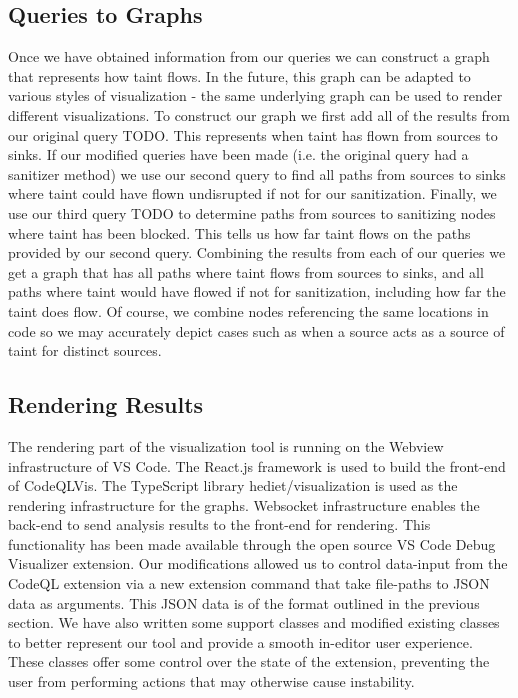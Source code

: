 \documentclass[sigplan,10pt,review]{acmart}
\begin{document}
\subsection{Queries to Graphs}
Once we have obtained information from our queries we can construct a graph that represents how taint flows. In the future, this graph can be adapted to various styles of visualization - the same underlying graph can be used to render different visualizations.
\newline
\indent To construct our graph we first add all of the results from our original query TODO. This represents when taint has flown from sources to sinks. If our modified queries have been made (i.e. the original query had a sanitizer method) we use our second query to find all paths from sources to sinks where taint could have flown undisrupted if not for our sanitization. Finally, we use our third query TODO to determine paths from sources to sanitizing nodes where taint has been blocked. This tells us how far taint flows on the paths provided by our second query. Combining the results from each of our queries we get a graph that has all paths where taint flows from sources to sinks, and all paths where taint would have flowed if not for sanitization, including how far the taint does flow. Of course, we combine nodes referencing the same locations in code so we may accurately depict cases such as when a source acts as a source of taint for distinct sources.

\subsection{Rendering Results}
The rendering part of the visualization tool is running on the Webview infrastructure of VS Code. The React.js framework is used to build the front-end of CodeQLVis. The TypeScript library hediet/visualization is used as the rendering infrastructure for the graphs. Websocket infrastructure enables the back-end to send analysis results to the front-end for rendering.
\newline
\indent This functionality has been made available through the open source VS Code Debug Visualizer extension. Our modifications allowed us to control data-input from the CodeQL extension via a new extension command that take file-paths to JSON data as arguments. This JSON data is of the format outlined in the previous section.
\newline
\indent We have also written some support classes and modified existing classes to better represent our tool and provide a smooth in-editor user experience. These classes offer some control over the state of the extension, preventing the user from performing actions that may otherwise cause instability.
\end{document}

